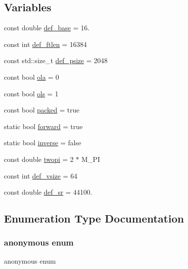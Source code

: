 \subsection*{Variables}
\begin{DoxyCompactItemize}
\item 
const double \hyperlink{namespace_aurora_acb267dff62f74484893c2d5b679b78bf}{def\+\_\+base} = 16.
\item 
const int \hyperlink{namespace_aurora_a14dabfd9feedfa09c0e6f86d2627f006}{def\+\_\+ftlen} = 16384
\item 
const std\+::size\+\_\+t \hyperlink{namespace_aurora_a080d03c33477d9c6322278722ca8e472}{def\+\_\+psize} = 2048
\item 
const bool \hyperlink{namespace_aurora_ab2cb0b1f6952bb2ca908ebd8156370db}{ola} = 0
\item 
const bool \hyperlink{namespace_aurora_a4e816792565225ccd6ba67110f75fb8b}{ols} = 1
\item 
const bool \hyperlink{namespace_aurora_a3e70ffc9ea5c526dcd66b1b14e43f175}{packed} = true
\item 
static bool \hyperlink{namespace_aurora_a20b1bd3f1b34b8676e26d07718dac352}{forward} = true
\item 
static bool \hyperlink{namespace_aurora_ac22c4e2e10572cbb6f64f3bd1cd595b5}{inverse} = false
\item 
const double \hyperlink{namespace_aurora_a4c08f8416c2b35d5001062f121459b5a}{twopi} = 2 $\ast$ M\+\_\+\+PI
\item 
const int \hyperlink{namespace_aurora_afaaddf667a06e7ce23c667a8b7295263}{def\+\_\+vsize} = 64
\item 
const double \hyperlink{namespace_aurora_ad49263d809bea98dd422e95bc91bc03e}{def\+\_\+sr} = 44100.
\end{DoxyCompactItemize}


\subsection{Enumeration Type Documentation}
\mbox{\label{namespace_aurora_a890b8d3786c8a25750e8097adae3b513}} 
\subsubsection{\texorpdfstring{anonymous enum}{anonymous enum}}
{\footnotesize\ttfamily anonymous enum}

